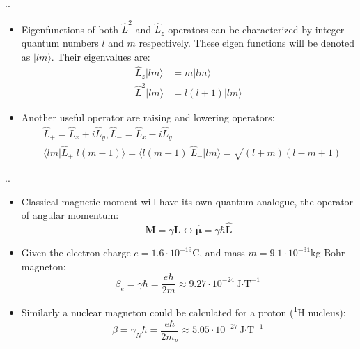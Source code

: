 \documentclass{beamer}
\begin{document}
\begin{frame}{\thesection.\thesubsection. \insertsubsection}
	\begin{itemize}[<+>]
		\item Eigenfunctions of both $\hat{L}^2$ and $\hat{L}_z$ operators can be characterized by integer quantum numbers $l$  and $m$ respectively. These eigen functions will be denoted as $\vert lm \rangle$. Their eigenvalues are:
		\begin{align}
		\hat{L}_z \vert lm \rangle &= m \vert lm \rangle \\
		\hat{L}^2 \vert lm \rangle &= l(l+1) \vert lm \rangle
		\end{align}
		\item Another useful operator are raising and lowering operators:
		\begin{align}
		  &\hat{L}_{+} = \hat{L}_x + i\hat{L}_y, \hat{L}_{-} = \hat{L}_x - i\hat{L}_y\\
		  &\langle lm \vert \hat{L}_{+} \vert l (m-1) \rangle = \langle l(m-1) \vert \hat{L}_{-} \vert lm \rangle = \sqrt{(l+m)(l-m+1)} \label{eq:L+}
		\end{align}
	\end{itemize}
	
\end{frame}


\begin{frame}{\thesection.\thesubsection. \insertsubsection}
	\begin{itemize}[<+>]
		\item
			Classical magnetic moment will have its own quantum analogue, the operator of angular momentum:
			\begin{equation}\label{eq:orbital_angular_momentum}
			\bm{M} = \gamma \bm{L}  \longleftrightarrow \bm{\hat{\mu}} = \gamma \hbar \bm{\hat{L}}
			\end{equation} 
		\item Given the electron charge $e= 1.6 \cdot 10^{-19}$C, and mass $m = 9.1 \cdot 10^{-31}$kg   \alert{Bohr magneton}:
		\begin{equation}
			\beta_e = \gamma \hbar = \dfrac{e\hbar}{2m} \approx 9.27 \cdot 10^{-24}  \text{J$\cdot$T}^{-1}
		\end{equation}
		\item Similarly a \alert{nuclear magneton} could be calculated for a proton (\textsuperscript{1}H nucleus):
		\begin{equation}
		\beta = \gamma_N \hbar = \dfrac{e\hbar}{2m_p} \approx 5.05 \cdot 10^{-27}  \text{J$\cdot$T}^{-1}
		\end{equation}
		
	\end{itemize}

\end{frame}
\end{document}
